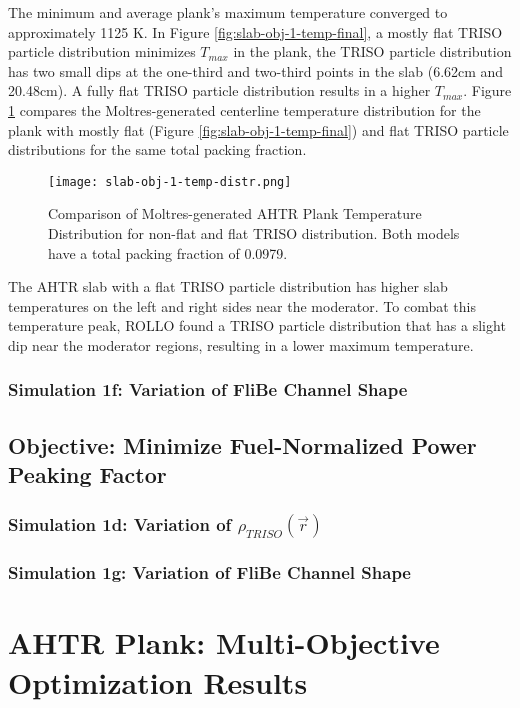 The minimum and average plank's maximum temperature converged to approximately 
1125 K. 
In Figure \ref{fig:slab-obj-1-temp-final}, a mostly flat TRISO 
particle distribution minimizes $T_{max}$ in the plank, the TRISO particle distribution 
has two small dips at the one-third and two-third points in the slab (6.62cm and 20.48cm). 
A fully flat TRISO particle distribution results in a higher $T_{max}$.
Figure \ref{fig:slab-obj-1-temp-distr} compares the Moltres-generated centerline 
temperature distribution for the plank with mostly flat (Figure 
\ref{fig:slab-obj-1-temp-final}) and flat TRISO particle distributions for the same 
total packing fraction.
\begin{figure}[]
    \centering
    \texttt{[image: slab-obj-1-temp-distr.png]}
    \caption{Comparison of Moltres-generated AHTR Plank Temperature Distribution for non-flat and flat
    TRISO distribution. Both models have a total packing fraction of 0.0979.}
    \label{fig:slab-obj-1-temp-distr}
\end{figure}
The AHTR slab with a flat TRISO particle distribution has higher slab temperatures 
on the left and right sides near the moderator. 
To combat this temperature peak, ROLLO found a TRISO particle distribution that 
has a slight dip near the moderator regions, resulting in a lower maximum 
temperature.  

\subsubsection{Simulation 1f: Variation of FliBe Channel Shape}

\subsection{Objective: Minimize Fuel-Normalized Power Peaking Factor}

\subsubsection{Simulation 1d: Variation of $\rho_{TRISO}(\vec{r})$}
\subsubsection{Simulation 1g: Variation of FliBe Channel Shape}

\section{AHTR Plank: Multi-Objective Optimization Results}